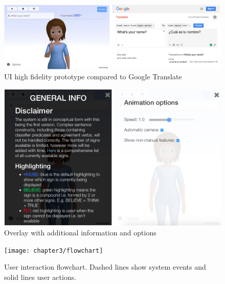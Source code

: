 \documentclass[12pt]{ociamthesis}  %
\begin{document}
\begin{figure}[H]
	\centering
    \includegraphics[scale=0.32]{chapter3/compare}
    \caption{UI high fidelity prototype compared to Google Translate}
    \label{fig:hifi}
\end{figure}

\begin{figure}[H]
	\centering
    \includegraphics[scale=0.33]{chapter3/info-option}
    \caption{Overlay with additional information and options}
    \label{fig:info-option}
\end{figure}

\begin{figure}[H]
	\centering
    \texttt{[image: chapter3/flowchart]}
    \caption[User interaction flowchart]{User interaction flowchart. Dashed lines show system events and solid lines user actions.}
    \label{fig:flow}
\end{figure}
\end{document}
